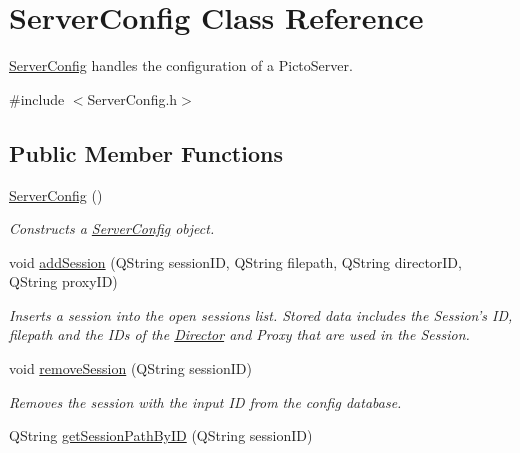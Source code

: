 \hypertarget{class_server_config}{\section{Server\-Config Class Reference}
\label{class_server_config}
}


\hyperlink{class_server_config}{Server\-Config} handles the configuration of a Picto\-Server.  




{\ttfamily \#include $<$Server\-Config.\-h$>$}

\subsection*{Public Member Functions}
\begin{DoxyCompactItemize}
\item 
\hyperlink{class_server_config_af61bcd662c3be06dd4219770350e65e6}{Server\-Config} ()
\begin{DoxyCompactList}\small\item\em Constructs a \hyperlink{class_server_config}{Server\-Config} object. \end{DoxyCompactList}\item 
\hypertarget{class_server_config_abb3cc44cbd2fca32dd9914bb481ba708}{void \hyperlink{class_server_config_abb3cc44cbd2fca32dd9914bb481ba708}{add\-Session} (Q\-String session\-I\-D, Q\-String filepath, Q\-String director\-I\-D, Q\-String proxy\-I\-D)}\label{class_server_config_abb3cc44cbd2fca32dd9914bb481ba708}

\begin{DoxyCompactList}\small\item\em Inserts a session into the open sessions list. Stored data includes the Session's I\-D, filepath and the I\-Ds of the \hyperlink{class_director}{Director} and Proxy that are used in the Session. \end{DoxyCompactList}\item 
\hypertarget{class_server_config_ab61785553877dc52c09a72df32178963}{void \hyperlink{class_server_config_ab61785553877dc52c09a72df32178963}{remove\-Session} (Q\-String session\-I\-D)}\label{class_server_config_ab61785553877dc52c09a72df32178963}

\begin{DoxyCompactList}\small\item\em Removes the session with the input I\-D from the config database. \end{DoxyCompactList}\item 
\hypertarget{class_server_config_a2b374738ea1e49524707831e9a3e9eb5}{Q\-String \hyperlink{class_server_config_a2b374738ea1e49524707831e9a3e9eb5}{get\-Session\-Path\-By\-I\-D} (Q\-String session\-I\-D)}\label{class_server_config_a2b374738ea1e49524707831e9a3e9eb5}


\end{DoxyCompactItemize}
